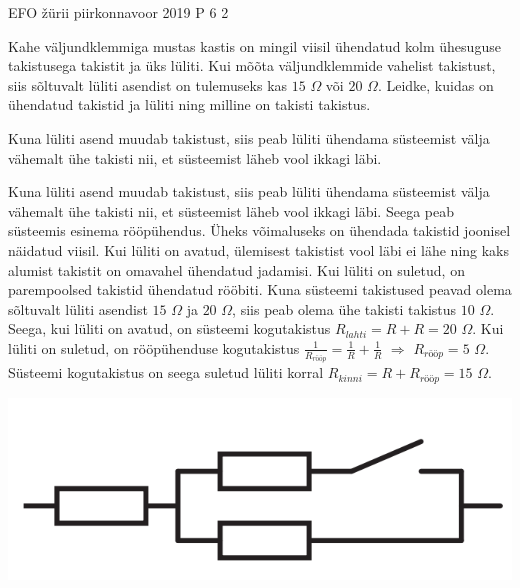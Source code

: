 {EFO žürii} %
{piirkonnavoor} %
{2019} %
{P 6} %
{2} %
{

\ifStatement
Kahe väljundklemmiga mustas kastis on mingil viisil ühendatud kolm ühesuguse takistusega takistit ja üks lüliti. Kui mõõta väljundklemmide vahelist takistust, siis sõltuvalt lüliti asendist on tulemuseks kas $15$ $\Omega$ või $20$ $\Omega$. Leidke, kuidas on ühendatud takistid ja lüliti ning milline on takisti takistus.
\fi

\ifHint
Kuna lüliti asend muudab takistust, siis peab lüliti ühendama süsteemist välja vähemalt ühe takisti nii, et süsteemist läheb vool ikkagi läbi.
\fi


\ifSolution
Kuna lüliti asend muudab takistust, siis peab lüliti ühendama süsteemist välja vähemalt ühe takisti nii, et süsteemist läheb vool ikkagi läbi. Seega peab süsteemis esinema rööpühendus. Üheks võimaluseks on ühendada takistid joonisel näidatud viisil. Kui lüliti on avatud, ülemisest takistist vool läbi ei lähe ning kaks alumist takistit on omavahel ühendatud jadamisi. Kui lüliti on suletud, on parempoolsed takistid ühendatud rööbiti. Kuna süsteemi takistused peavad olema sõltuvalt lüliti asendist $15$ $\Omega$ ja $20$ $\Omega$, siis peab olema ühe takisti takistus $10$ $\Omega$. Seega, kui lüliti on avatud, on süsteemi kogutakistus $R_{lahti} = R + R = 20$ $\Omega$. Kui lüliti on suletud, on rööpühenduse kogutakistus $\frac{1}{R_{rööp}} = \frac{1}{R} + \frac{1}{R}$ $\Rightarrow$ $R_{rööp} = 5$ $\Omega$. Süsteemi kogutakistus on seega suletud lüliti korral $R_{kinni} = R + R_{rööp} = 15$ $\Omega$.
\begin{center}
	\includegraphics[width=0.5\linewidth]{2019-v2p-06-lah.png}
\end{center}
\fi
}